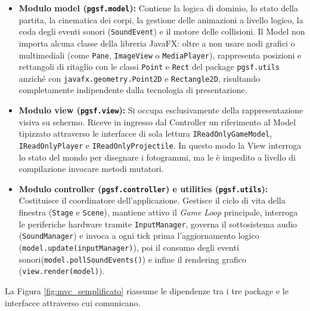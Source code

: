\documentclass[11pt, a4paper]{article}
\begin{document}
	\begin{itemize}
		\item \textbf{Modulo model (\texttt{pgsf.model}):} Contiene la logica di dominio, lo stato della partita, la cinematica dei corpi, la gestione delle animazioni a livello logico, la coda degli eventi sonori (\texttt{SoundEvent}) e il motore delle collisioni. Il Model non importa alcuna classe della libreria JavaFX: oltre a non usare nodi grafici o multimediali (come \texttt{Pane}, \texttt{ImageView} o \texttt{MediaPlayer}), rappresenta posizioni e rettangoli di ritaglio con le classi \texttt{Point} e \texttt{Rect} del package \texttt{pgsf.utils} anziché con \texttt{javafx.geometry.Point2D} e \texttt{Rectangle2D}, risultando completamente indipendente dalla tecnologia di presentazione.
		\item \textbf{Modulo view (\texttt{pgsf.view}):} Si occupa esclusivamente della rappresentazione visiva su schermo. Riceve in ingresso dal Controller un riferimento al Model tipizzato attraverso le interfacce di sola lettura \texttt{IReadOnlyGameModel}, \texttt{IReadOnlyPlayer} e \texttt{IReadOnlyProjectile}. In questo modo la View interroga lo stato del mondo per disegnare i fotogrammi, ma le è impedito a livello di compilazione invocare metodi mutatori.
		\item \textbf{Modulo controller (\texttt{pgsf.controller}) e utilities (\texttt{pgsf.utils}):} Costituisce il coordinatore dell'applicazione. Gestisce il ciclo di vita della finestra (\texttt{Stage} e \texttt{Scene}), mantiene attivo il \emph{Game Loop} principale, interroga le periferiche hardware tramite \texttt{InputManager}, governa il sottosistema audio (\texttt{SoundManager}) e invoca a ogni tick prima l'aggiornamento logico (\texttt{model.update(inputManager)}), poi il consumo degli eventi sonori\newline(\texttt{model.pollSoundEvents()}) e infine il rendering grafico (\texttt{view.render(model)}).
	\end{itemize}
	
	La Figura \ref{fig:mvc_semplificato} riassume le dipendenze tra i tre package e le interfacce attraverso cui comunicano.
	
\end{document}

